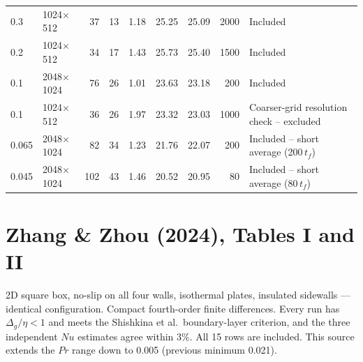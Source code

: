 \documentclass[11pt]{article}
\begin{document}
\begin{longtable}{l l r r r r r r p{4.4cm}}
\rowcolor{included} 0.3 & 1024$\times$512 & 37 & 13 & 1.18 & 25.25 & 25.09 & 2000 & Included \\
\rowcolor{included} 0.2 & 1024$\times$512 & 34 & 17 & 1.43 & 25.73 & 25.40 & 1500 & Included \\
\rowcolor{included} 0.1 & 2048$\times$1024 & 76 & 26 & 1.01 & 23.63 & 23.18 & 200 & Included \\
\rowcolor{excluded} 0.1 & 1024$\times$512 & 36 & 26 & 1.97 & 23.32 & 23.03 & 1000 & Coarser-grid resolution check -- excluded \\
\rowcolor{included} 0.065 & 2048$\times$1024 & 82 & 34 & 1.23 & 21.76 & 22.07 & 200 & Included -- short average (200\,$t_f$) \\
\rowcolor{included} 0.045 & 2048$\times$1024 & 102 & 43 & 1.46 & 20.52 & 20.95 & 80 & Included -- short average (80\,$t_f$) \\
\end{longtable}

\section{Zhang \& Zhou (2024), Tables I and II}\label{sec:zz2024}
2D square box, no-slip on all four walls, isothermal plates, insulated
sidewalls --- identical configuration. Compact fourth-order finite
differences. Every run has $\Delta_g/\eta<1$ and meets the Shishkina et al.\
boundary-layer criterion, and the three independent $Nu$ estimates agree
within 3\%. All 15 rows are included. This source extends the $Pr$ range
down to 0.005 (previous minimum 0.021).
\end{document}
